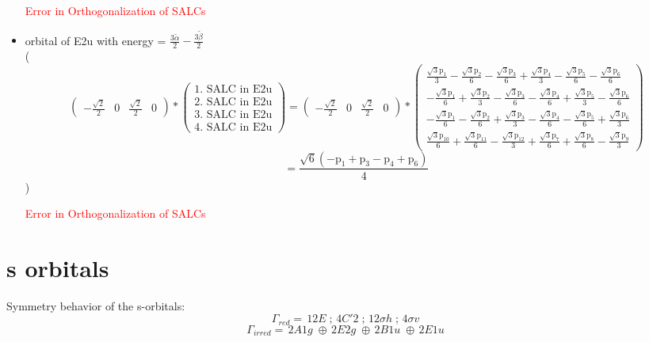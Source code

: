\documentclass[12pt,a4paper]{article}
\begin{document}
\begin{itemize}
\textcolor{red}{Error in Orthogonalization of SALCs}\item orbital of E2u with energy = 
                                $\frac{3 \tilde{\alpha}}{2} - \frac{3 \tilde{\beta}}{2}$ \\
( 
$$
\begin{pmatrix}- \frac{\sqrt{2}}{2} & 0 & \frac{\sqrt{2}}{2} & 0\end{pmatrix} * \left(\begin{array}{c}\text{1. SALC in E2u} \\ \text{2. SALC in E2u} \\ \text{3. SALC in E2u} \\ \text{4. SALC in E2u}\end{array}\right) = \begin{pmatrix}- \frac{\sqrt{2}}{2} & 0 & \frac{\sqrt{2}}{2} & 0\end{pmatrix} * \begin{pmatrix}\frac{\sqrt{3} \text{p}_{1}}{3} - \frac{\sqrt{3} \text{p}_{2}}{6} - \frac{\sqrt{3} \text{p}_{3}}{6} + \frac{\sqrt{3} \text{p}_{4}}{3} - \frac{\sqrt{3} \text{p}_{5}}{6} - \frac{\sqrt{3} \text{p}_{6}}{6}\\- \frac{\sqrt{3} \text{p}_{1}}{6} + \frac{\sqrt{3} \text{p}_{2}}{3} - \frac{\sqrt{3} \text{p}_{3}}{6} - \frac{\sqrt{3} \text{p}_{4}}{6} + \frac{\sqrt{3} \text{p}_{5}}{3} - \frac{\sqrt{3} \text{p}_{6}}{6}\\- \frac{\sqrt{3} \text{p}_{1}}{6} - \frac{\sqrt{3} \text{p}_{2}}{6} + \frac{\sqrt{3} \text{p}_{3}}{3} - \frac{\sqrt{3} \text{p}_{4}}{6} - \frac{\sqrt{3} \text{p}_{5}}{6} + \frac{\sqrt{3} \text{p}_{6}}{3}\\\frac{\sqrt{3} \text{p}_{10}}{6} + \frac{\sqrt{3} \text{p}_{11}}{6} - \frac{\sqrt{3} \text{p}_{12}}{3} + \frac{\sqrt{3} \text{p}_{7}}{6} + \frac{\sqrt{3} \text{p}_{8}}{6} - \frac{\sqrt{3} \text{p}_{9}}{3}\end{pmatrix} 
 $$ $$ = \frac{\sqrt{6} \left(- \text{p}_{1} + \text{p}_{3} - \text{p}_{4} + \text{p}_{6}\right)}{4} 
 $$ 
 )

\textcolor{red}{Error in Orthogonalization of SALCs}\end{itemize}



\newpage \section*{s orbitals}
Symmetry behavior of the s-orbitals:
$$\mathsf{\Gamma}_{red} = \,12 E\;; \,4 C'2\;; \,12 \sigma h\;; \,4 \sigma v\;$$
$$\mathsf{\Gamma}_{irred} = \,2 A1g\;\oplus{}\,2 E2g\;\oplus{}\,2 B1u\;\oplus{}\,2 E1u\;$$
\end{document}

